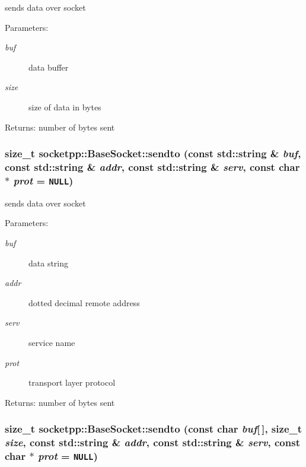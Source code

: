 \begin{CompactItemize}
sends data over socket 

\begin{Desc}
\item[Parameters:]
\begin{description}
\item[{\em buf}]data buffer \item[{\em size}]size of data in bytes \end{description}
\end{Desc}
\begin{Desc}
\item[Returns:]number of bytes sent \end{Desc}
\hypertarget{classsocketpp_1_1BaseSocket_5fd9737270ee71d2292e70ed625d63f9}{
\subsubsection[{sendto}]{\setlength{\rightskip}{0pt plus 5cm}size\_\-t socketpp::BaseSocket::sendto (const std::string \& {\em buf}, \/  const std::string \& {\em addr}, \/  const std::string \& {\em serv}, \/  const char $\ast$ {\em prot} = {\tt NULL})}}
\label{classsocketpp_1_1BaseSocket_5fd9737270ee71d2292e70ed625d63f9}


sends data over socket 

\begin{Desc}
\item[Parameters:]
\begin{description}
\item[{\em buf}]data string \item[{\em addr}]dotted decimal remote address \item[{\em serv}]service name \item[{\em prot}]transport layer protocol \end{description}
\end{Desc}
\begin{Desc}
\item[Returns:]number of bytes sent \end{Desc}
\hypertarget{classsocketpp_1_1BaseSocket_c0bbca9725a55a2e6a822536efd31b73}{
\subsubsection[{sendto}]{\setlength{\rightskip}{0pt plus 5cm}size\_\-t socketpp::BaseSocket::sendto (const char {\em buf}\mbox{[}$\,$\mbox{]}, \/  size\_\-t {\em size}, \/  const std::string \& {\em addr}, \/  const std::string \& {\em serv}, \/  const char $\ast$ {\em prot} = {\tt NULL})}}
\label{classsocketpp_1_1BaseSocket_c0bbca9725a55a2e6a822536efd31b73}



\end{CompactItemize}
